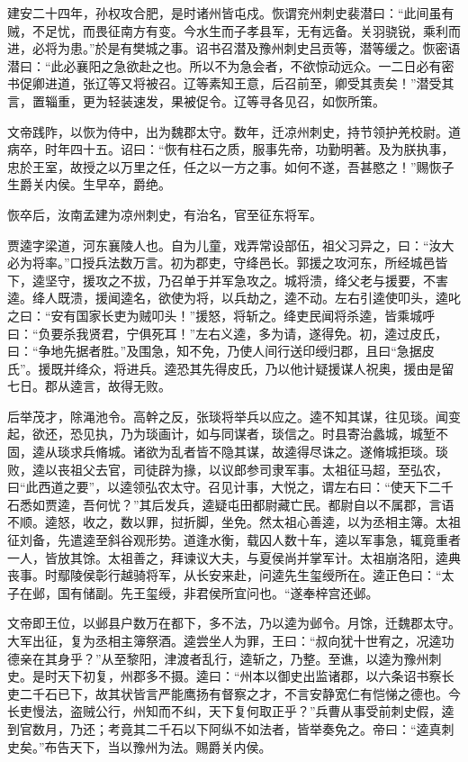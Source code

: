 \documentclass[12pt,UTF8]{ctexbook}
\begin{document}
建安二十四年，孙权攻合肥，是时诸州皆屯戍。恢谓兖州刺史裴潜曰：“此间虽有贼，不足忧，而畏征南方有变。今水生而子孝县军，无有远备。关羽骁锐，乘利而进，必将为患。”於是有樊城之事。诏书召潜及豫州刺史吕贡等，潜等缓之。恢密语潜曰：“此必襄阳之急欲赴之也。所以不为急会者，不欲惊动远众。一二日必有密书促卿进道，张辽等又将被召。辽等素知王意，后召前至，卿受其责矣！”潜受其言，置辎重，更为轻装速发，果被促令。辽等寻各见召，如恢所策。

文帝践阼，以恢为侍中，出为魏郡太守。数年，迁凉州刺史，持节领护羌校尉。道病卒，时年四十五。诏曰：“恢有柱石之质，服事先帝，功勤明著。及为朕执事，忠於王室，故授之以万里之任，任之以一方之事。如何不遂，吾甚愍之！”赐恢子生爵关内侯。生早卒，爵绝。

恢卒后，汝南孟建为凉州刺史，有治名，官至征东将军。

贾逵字梁道，河东襄陵人也。自为儿童，戏弄常设部伍，祖父习异之，曰：“汝大必为将率。”口授兵法数万言。初为郡吏，守绛邑长。郭援之攻河东，所经城邑皆下，逵坚守，援攻之不拔，乃召单于并军急攻之。城将溃，绛父老与援要，不害逵。绛人既溃，援闻逵名，欲使为将，以兵劫之，逵不动。左右引逵使叩头，逵叱之曰：“安有国家长吏为贼叩头！”援怒，将斩之。绛吏民闻将杀逵，皆乘城呼曰：“负要杀我贤君，宁俱死耳！”左右义逵，多为请，遂得免。初，逵过皮氏，曰：“争地先据者胜。”及围急，知不免，乃使人间行送印绶归郡，且曰“急据皮氏”。援既并绛众，将进兵。逵恐其先得皮氏，乃以他计疑援谋人祝奥，援由是留七日。郡从逵言，故得无败。

后举茂才，除渑池令。高幹之反，张琰将举兵以应之。逵不知其谋，往见琰。闻变起，欲还，恐见执，乃为琰画计，如与同谋者，琰信之。时县寄治蠡城，城堑不固，逵从琰求兵脩城。诸欲为乱者皆不隐其谋，故逵得尽诛之。遂脩城拒琰。琰败，逵以丧祖父去官，司徒辟为掾，以议郎参司隶军事。太祖征马超，至弘农，曰“此西道之要”，以逵领弘农太守。召见计事，大悦之，谓左右曰：“使天下二千石悉如贾逵，吾何忧？”其后发兵，逵疑屯田都尉藏亡民。都尉自以不属郡，言语不顺。逵怒，收之，数以罪，挝折脚，坐免。然太祖心善逵，以为丞相主簿。太祖征刘备，先遣逵至斜谷观形势。道逢水衡，载囚人数十车，逵以军事急，辄竟重者一人，皆放其馀。太祖善之，拜谏议大夫，与夏侯尚并掌军计。太祖崩洛阳，逵典丧事。时鄢陵侯彰行越骑将军，从长安来赴，问逵先生玺绶所在。逵正色曰：“太子在邺，国有储副。先王玺绶，非君侯所宜问也。“遂奉梓宫还邺。

文帝即王位，以邺县户数万在都下，多不法，乃以逵为邺令。月馀，迁魏郡太守。大军出征，复为丞相主簿祭酒。逵尝坐人为罪，王曰：“叔向犹十世宥之，况逵功德亲在其身乎？”从至黎阳，津渡者乱行，逵斩之，乃整。至谯，以逵为豫州刺史。是时天下初复，州郡多不摄。逵曰：“州本以御史出监诸郡，以六条诏书察长吏二千石已下，故其状皆言严能鹰扬有督察之才，不言安静宽仁有恺悌之德也。今长吏慢法，盗贼公行，州知而不纠，天下复何取正乎？”兵曹从事受前刺史假，逵到官数月，乃还；考竟其二千石以下阿纵不如法者，皆举奏免之。帝曰：“逵真刺史矣。”布告天下，当以豫州为法。赐爵关内侯。
\end{document}
